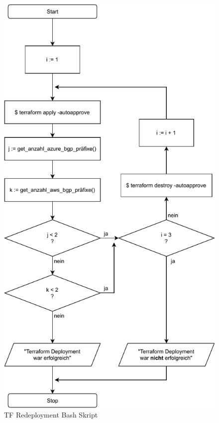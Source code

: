 \begin{figure}[h]
  \centering
  \includegraphics{Figures/programmablaufplan_bash_deploy_tf.pdf}
  \caption{TF Redeployment Bash Skript}
  \label{grafik:programmablaufplan_bash_deploy_tf}
\end{figure}\FloatBarrier


